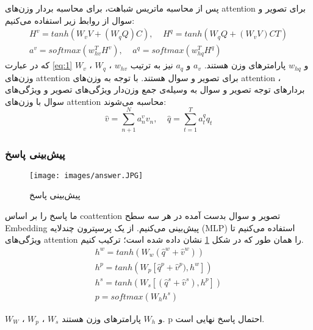 {{{			 پس از محاسبه ماتریس شباهت، برای محاسبه بردار وزن‌های attention برای تصویر و سوال از روابط زیر استفاده می‌کنیم:
			 \begin{equation}
			 \begin{aligned}
			 	H^v = tanh(W_vV + (W_qQ)C), \ \ \ \ \  H^q = tanh(W_qQ+ (W_vV)CT)\\
			 	a^v = softmax(w^T_{hv}H^v), \ \ \ \ \  a^q = softmax(w^T_{hq}H^q) \ \ \ \ \ \ \ \ \ \ \ \ \ 
			 \end{aligned}
			 \label{eq:1}
			 \end{equation}
			 که در عبارت 
			 \ref{eq:1}
			 $W_v$
			 ، 
			 $W_q$
			 ،
			 $w_{hv}$
			 و
			 $w_{hq}$
			 پارامترهای وزن هستند. 
			 $a_v$
			 و 
			 $a_q$
			 نیز به ترتیب وزن‌های attention برای تصویر و سوال هستند. با توجه به وزن‌های attention ، بردارهای توجه تصویر و سوال به وسیله‌ی جمع وزن‌دار ویژگی‌های تصویر و ویژگی‌های سوال با وزن‌های attention محاسبه می‌شوند:
			 \begin{equation}
			 \hat{v} =\sum_{n+1}^{N} a^v_nv_n,\ \ \ \ \ \hat{q} = \sum_{t=1}^{T}a^q_t q_t
			 \end{equation}
			 
		}
	
		\subsubsection{پیش‌بینی پاسخ}
		{
			\begin{figure}[h]
				\centering
				\texttt{[image: images/answer.JPG]}
				\caption{پیش‌بینی پاسخ}
				\label{fig:6}
			\end{figure}
		
			ما پاسخ را بر اساس coattention تصویر و سوال بدست آمده در هر سه سطح Embedding پیش‌بینی می‌کنیم. از یک پرسپترون چندلایه (MLP) استفاده می‌کنیم تا ویژگی‌های attention را همان طور که در شکل 
		\ref{fig:6}	
			نشان داده شده است؛ ترکیب کنیم.
			\begin{equation}
			\begin{aligned}
			h^w = tanh(W_w(\hat{q}^w + \hat{v}^w))\ \ \ \  \\
			h^p = tanh(W_p[\hat{q}^p + \hat{v}^p), h^w]) \\
			h^s = tanh(W_s[(\hat{q}^s + \hat{v}^s), h^p]) \\
			p = softmax(W_hh^s)  \ \ \ \ \ \ \ \ \ \ \ \ \ 
			\end{aligned}
			\end{equation}
		
			 $W_W$
			 ، 
			 $W_p$
			 ،
			 $W_s$
			  و
			 $W_h$
			  	پارامترهای وزن هستند. p احتمال پاسخ نهایی است.
		}
	}

}

